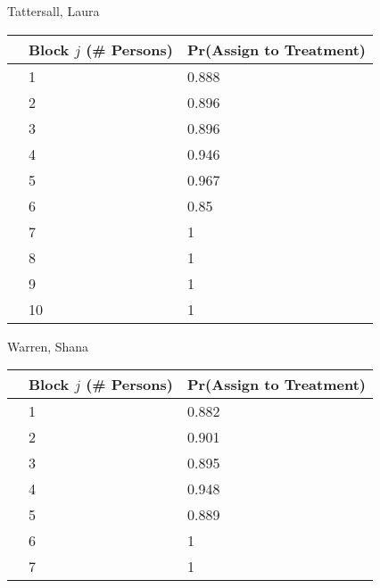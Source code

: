 \documentclass[11pt,notitlepage]{article}
\begin{document}
\begin{table}[h!]
\begin{center}
\begin{minipage}[t]{0.45\linewidth}\centering

Tattersall, Laura

\begin{tabular}{rll}
  \hline
 & Block $j$ (\# Persons) & Pr(Assign to Treatment) \\ 
  \hline
  & 1 & 0.888 \\ 
  & 2 & 0.896 \\ 
  & 3 & 0.896 \\ 
  & 4 & 0.946 \\ 
  & 5 & 0.967 \\ 
  & 6 & 0.85 \\ 
  & 7 & 1 \\ 
  & 8 & 1 \\ 
  & 9 & 1 \\ 
   & 10 & 1 \\ 
   \hline
\end{tabular}

\end{minipage}
\hspace{0.5cm}
\begin{minipage}[t]{0.45\linewidth}\centering

Warren, Shana

\begin{tabular}{rll}
  \hline
 & Block $j$ (\# Persons) & Pr(Assign to Treatment) \\ 
  \hline
   & 1 & 0.882 \\ 
   & 2 & 0.901 \\ 
   & 3 & 0.895 \\ 
   & 4 & 0.948 \\ 
   & 5 & 0.889 \\ 
   & 6 & 1 \\ 
   & 7 & 1 \\ 
   \hline
\end{tabular}


\end{minipage}
\end{center}
\end{table}

\clearpage
\end{document}
